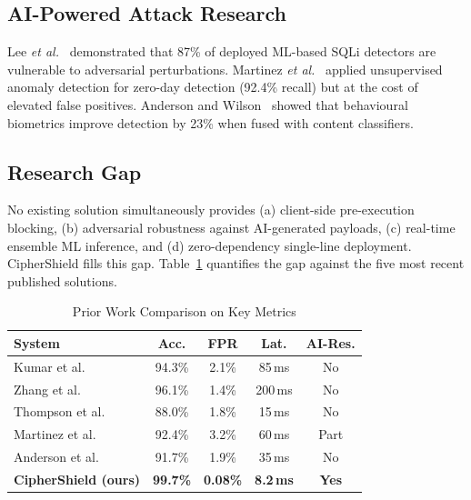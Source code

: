 \documentclass[10pt,twocolumn]{article}
\begin{document}
\subsection{AI-Powered Attack Research}

Lee \textit{et al.}~\cite{lee2024} demonstrated that 87\% of deployed
ML-based SQLi detectors are vulnerable to adversarial perturbations.
Martinez \textit{et al.}~\cite{martinez2025} applied unsupervised anomaly
detection for zero-day detection (92.4\% recall) but at the cost of
elevated false positives. Anderson and Wilson~\cite{anderson2025} showed
that behavioural biometrics improve detection by 23\% when fused with
content classifiers.

\subsection{Research Gap}

No existing solution simultaneously provides (a) client-side pre-execution
blocking, (b) adversarial robustness against AI-generated payloads,
(c) real-time ensemble ML inference, and (d) zero-dependency single-line
deployment. CipherShield fills this gap. Table~\ref{tab:prior} quantifies
the gap against the five most recent published solutions.

\begin{table}[H]
\centering
\caption{Prior Work Comparison on Key Metrics}
\label{tab:prior}
\small
\setlength{\tabcolsep}{3pt}
\begin{tabular}{@{}lcccc@{}}
\toprule
\textbf{System} & \textbf{Acc.} & \textbf{FPR} & \textbf{Lat.} & \textbf{AI-Res.} \\
\midrule
Kumar et al.~\cite{kumar2024}     & 94.3\% & 2.1\% & 85\,ms  & No  \\
Zhang et al.~\cite{zhang2024}     & 96.1\% & 1.4\% & 200\,ms & No  \\
Thompson et al.~\cite{thompson2024}& 88.0\% & 1.8\% & 15\,ms  & No  \\
Martinez et al.~\cite{martinez2025}& 92.4\% & 3.2\% & 60\,ms  & Part\\
Anderson et al.~\cite{anderson2025}& 91.7\% & 1.9\% & 35\,ms  & No  \\
\textbf{CipherShield (ours)}      & \textbf{99.7\%} & \textbf{0.08\%} & \textbf{8.2\,ms} & \textbf{Yes} \\
\bottomrule
\end{tabular}
\end{table}

\end{document}
